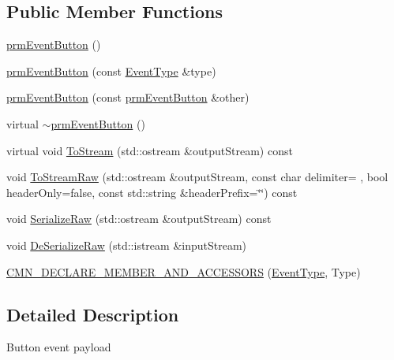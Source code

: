 \subsection*{Public Member Functions}
\begin{DoxyCompactItemize}
\item 
\hyperlink{classprm_event_button_abb601ba30b2ba17e59289416214bd527}{prm\+Event\+Button} ()
\item 
\hyperlink{classprm_event_button_aa506df272acb1954c2be49e2dffbe1dd}{prm\+Event\+Button} (const \hyperlink{classprm_event_button_ad25147a00b664a6df0de483dad956b0b}{Event\+Type} \&type)
\item 
\hyperlink{classprm_event_button_ae44ec7b618d6585575a846a1522bedd8}{prm\+Event\+Button} (const \hyperlink{classprm_event_button}{prm\+Event\+Button} \&other)
\item 
virtual \hyperlink{classprm_event_button_aa9b9e8e0a4c1450a49b113f91f47df62}{$\sim$prm\+Event\+Button} ()
\item 
virtual void \hyperlink{classprm_event_button_a812f67465076aaea87f9d64106072fb0}{To\+Stream} (std\+::ostream \&output\+Stream) const 
\item 
void \hyperlink{classprm_event_button_a2811ddd9856b125f561d9e71dae541b0}{To\+Stream\+Raw} (std\+::ostream \&output\+Stream, const char delimiter= \textquotesingle{} \textquotesingle{}, bool header\+Only=false, const std\+::string \&header\+Prefix=\char`\"{}\char`\"{}) const 
\item 
void \hyperlink{classprm_event_button_a5c8e6692f35b986ab7d53d01b3cece8f}{Serialize\+Raw} (std\+::ostream \&output\+Stream) const 
\item 
void \hyperlink{classprm_event_button_ab93e173e3a451a97a62a23049c810006}{De\+Serialize\+Raw} (std\+::istream \&input\+Stream)
\end{DoxyCompactItemize}
{\bf }\par
\begin{DoxyCompactItemize}
\item 
\hyperlink{classprm_event_button_a86616288c9b71c87bfbd84aaecb50762}{C\+M\+N\+\_\+\+D\+E\+C\+L\+A\+R\+E\+\_\+\+M\+E\+M\+B\+E\+R\+\_\+\+A\+N\+D\+\_\+\+A\+C\+C\+E\+S\+S\+O\+R\+S} (\hyperlink{classprm_event_button_ad25147a00b664a6df0de483dad956b0b}{Event\+Type}, Type)
\end{DoxyCompactItemize}



\subsection{Detailed Description}
Button event payload 

